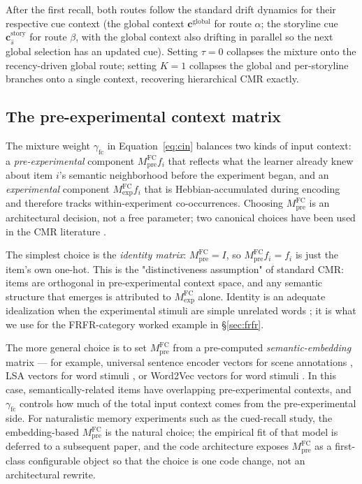 \documentclass[10pt]{article}
\newcommand{\cstory}{\mathbf{c}^{\mathrm{story}}}
\newcommand{\cglob}{\mathbf{c}^{\mathrm{global}}}
\newcommand{\MFCpre}{M^{\mathrm{FC}}_{\mathrm{pre}}}
\newcommand{\MFCexp}{M^{\mathrm{FC}}_{\mathrm{exp}}}
\newcommand{\gammafc}{\gamma_{\mathrm{fc}}}
\newcommand{\tauinit}{\tau}
\begin{document}
After the first recall, both routes follow the standard
\citeauthor{CornellZhang2025} drift dynamics for their respective cue
context (the global context $\cglob$ for route $\alpha$; the
storyline cue $\cstory_{\hat{s}}$ for route $\beta$, with the global
context also drifting in parallel so the next global selection has an
updated cue). Setting $\tauinit = 0$ collapses the mixture onto the
recency-driven global route; setting $K = 1$ collapses the global and
per-storyline branches onto a single context, recovering
\citeauthor{CornellZhang2025} hierarchical CMR exactly.

\subsection{The pre-experimental context matrix}
\label{sec:preexp}

The mixture weight $\gammafc$ in Equation~\ref{eq:cin} balances two
kinds of input context: a \emph{pre-experimental} component
$\MFCpre f_i$ that reflects what the learner already knew about item
$i$'s semantic neighborhood before the experiment began, and an
\emph{experimental} component $\MFCexp f_i$ that is Hebbian-accumulated
during encoding and therefore tracks within-experiment co-occurrences.
Choosing $\MFCpre$ is an architectural decision, not a free parameter;
two canonical choices have been used in the CMR literature
\citep{PolyEtal09,MortPoly16,HeusMann18,XuEtAl2024}.

The simplest choice is the \emph{identity matrix}: $\MFCpre = I$, so
$\MFCpre f_i = f_i$ is just the item's own one-hot. This is the
"distinctiveness assumption" of standard CMR: items are orthogonal in
pre-experimental context space, and any semantic structure that
emerges is attributed to $\MFCexp$ alone. Identity is an adequate
idealization when the experimental stimuli are simple unrelated words
\citep{PolyEtal09}; it is what we use for the FRFR-category worked
example in \S\ref{sec:frfr}.

The more general choice is to set $\MFCpre$ from a pre-computed
\emph{semantic-embedding} matrix --- for example, universal sentence
encoder vectors for scene annotations \citep{HeusMann18,XuEtAl2024},
LSA vectors for word stimuli \citep{MortPoly16}, or Word2Vec vectors
for word stimuli \citep{CornellZhang2025}. In this case,
semantically-related items have overlapping pre-experimental contexts,
and $\gammafc$ controls how much of the total input context comes from
the pre-experimental side. For naturalistic memory experiments such
as the \citet{XuDuncanManning} cued-recall study, the embedding-based
$\MFCpre$ is the natural choice; the empirical fit of that model is
deferred to a subsequent paper, and the code architecture exposes
$\MFCpre$ as a first-class configurable object so that the choice is
one code change, not an architectural rewrite.
\end{document}
